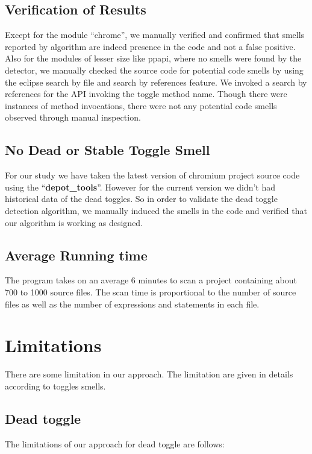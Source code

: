 \documentclass[conference]{IEEEtran}
\begin{document}
\subsection{Verification of Results}
\label{Result Varification}
Except for the module “chrome”, we manually verified and confirmed that smells reported by algorithm are indeed presence in the code and not a false positive. Also for the modules of lesser size like ppapi, where no smells were found by the detector, we manually checked the source code for potential code smells by using the eclipse search by file and search by references feature. We invoked a search by references for the API invoking the toggle method name. Though there were instances of method invocations, there were not any potential code smells observed through manual inspection.

\subsection{No Dead or Stable Toggle Smell}
For our study we have taken the latest version of chromium project source code using the ``\textbf{depot\_tools}''. However for the current version we didn’t had historical data of the dead toggles. So in order to validate the dead toggle detection algorithm, we manually induced the smells in the code and verified that our algorithm is working as designed.

\subsection{Average Running time}
The program takes on an average 6 minutes to scan a project containing about 700 to 1000 source files. The scan time is proportional to the number of source files as well as the number of expressions and statements in each file. 

\section{Limitations}
\label{Limitation of our approach}
There are some limitation in our approach. The limitation are given in details according to toggles smells.
\subsection{Dead toggle}
The limitations of our approach for dead toggle are follows:
\end{document}
